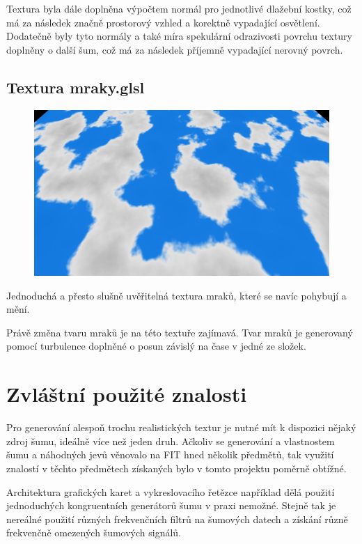 \documentclass[12pt,a4paper,titlepage,final]{report}
\begin{document}
Textura byla dále doplněna výpočtem normál pro jednotlivé dlažební kostky, což má za následek značně prostorový vzhled a korektně vypadající osvětlení. Dodatečně byly tyto normály a také míra spekulární odrazivosti povrchu textury doplněny o další šum, což má za následek příjemně vypadající nerovný povrch.

\section{Textura mraky.glsl}
\begin{figure}[h]
	\captionsetup{type=figure}
	\includegraphics[width=\textwidth]{images/mraky.png}
\end{figure}

Jednoduchá a přesto slušně uvěřitelná textura mraků, které se navíc pohybují a mění. 

Právě změna tvaru mraků je  na této textuře zajímavá. Tvar mraků je generovaný pomocí turbulence doplněné o posun závislý na čase v jedné ze složek.


\chapter{Zvláštní použité znalosti}
Pro generování alespoň trochu realistických textur je nutné mít k dispozici nějaký zdroj šumu, ideálně více než jeden druh. Ačkoliv se generování a vlastnostem šumu a náhodných jevů věnovalo na FIT hned několik předmětů, tak využití znalostí v těchto předmětech získaných bylo v tomto projektu poměrně obtížné. 

Architektura grafických karet a vykreslovacího řetězce například dělá použití jednoduchých kongruentních generátorů šumu v praxi nemožné. Stejně tak je nereálné použití různých frekvenčních filtrů na šumových datech a získání různě frekvenčně omezených šumových signálů.
\end{document}
